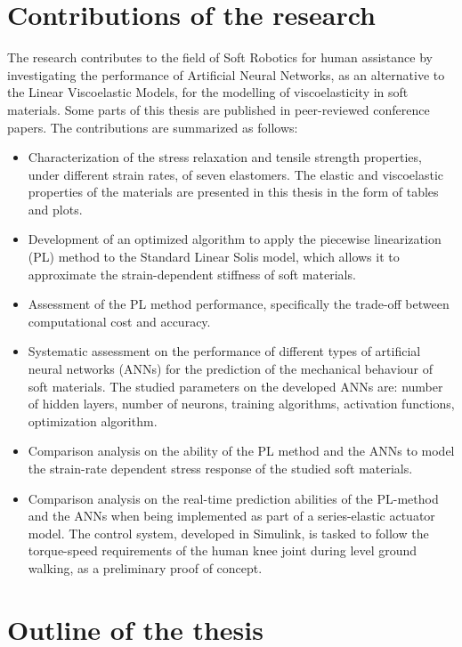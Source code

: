 \newpage

\section{Contributions of the research}

The research contributes to the field of Soft Robotics for human assistance by investigating the performance of Artificial Neural Networks, as an alternative to the Linear Viscoelastic Models, for the modelling of viscoelasticity in soft materials. Some parts of this thesis are published in peer-reviewed conference papers. The contributions are summarized as follows:

\begin{itemize}
    \item Characterization of the stress relaxation and tensile strength properties, under different strain rates, of seven elastomers. The elastic and viscoelastic properties of the materials are presented in this thesis in the form of tables and plots.
    \item Development of an optimized algorithm to apply the piecewise linearization (PL) method to the Standard Linear Solis model, which allows it to approximate the strain-dependent stiffness of soft materials.
    \item Assessment of the PL method performance, specifically the trade-off between computational cost and accuracy.
    \item Systematic assessment on the performance of different types of artificial neural networks (ANNs) for the prediction of the mechanical behaviour of soft materials. The studied parameters on the developed ANNs are: number of hidden layers, number of neurons, training algorithms, activation functions, optimization algorithm.
    \item Comparison analysis on the ability of the PL method and the ANNs to model the strain-rate dependent stress response of the studied soft materials.
    \item Comparison analysis on the real-time prediction abilities of the PL-method and the ANNs when being implemented as part of a series-elastic actuator model. The control system, developed in Simulink, is tasked to follow the torque-speed requirements of the human knee joint during level ground walking, as a preliminary proof of concept.
\end{itemize}

\section{Outline of the thesis}


